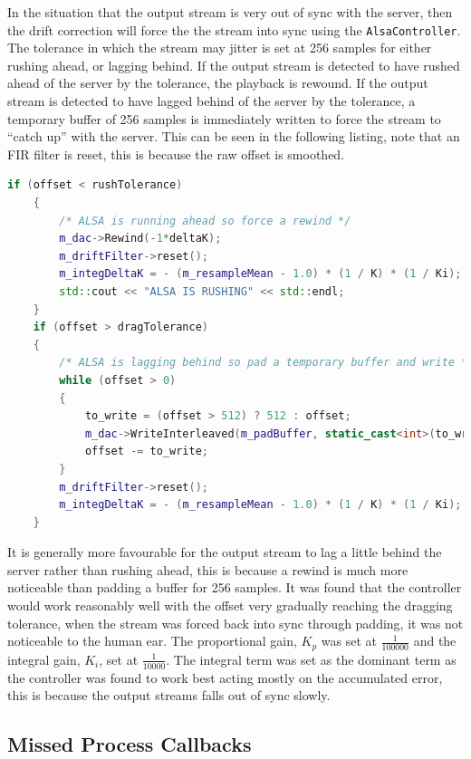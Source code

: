 \documentclass[main.tex]{subfiles}
\begin{document}
In the situation that the output stream is very out of sync with the server, then the drift correction will force the the stream into sync using the \lstinline{AlsaController}.
The tolerance in which the stream may jitter is set at 256 samples for either rushing ahead, or lagging behind.
If the output stream is detected to have rushed ahead of the server by the tolerance, the playback is rewound.
If the output stream is detected to have lagged behind of the server by the tolerance, a temporary buffer of 256 samples is immediately written to force the stream to ``catch up'' with the server. 
This can be seen in the following listing, note that an FIR filter is reset, this is because the raw offset is smoothed. 

\begin{lstlisting}[language=c++, caption={Hard Rewind or Buffer Padding for Unsynchronised Streams}]
    if (offset < rushTolerance)
    {
        /* ALSA is running ahead so force a rewind */
        m_dac->Rewind(-1*deltaK);
        m_driftFilter->reset();
        m_integDeltaK = - (m_resampleMean - 1.0) * (1 / K) * (1 / Ki);
        std::cout << "ALSA IS RUSHING" << std::endl;
    }
    if (offset > dragTolerance)
    {
        /* ALSA is lagging behind so pad a temporary buffer and write */
        while (offset > 0) 
        {
	        to_write = (offset > 512) ? 512 : offset;
            m_dac->WriteInterleaved(m_padBuffer, static_cast<int>(to_write));
	        offset -= to_write;  
	    }
        m_driftFilter->reset();
        m_integDeltaK = - (m_resampleMean - 1.0) * (1 / K) * (1 / Ki);  
    }
\end{lstlisting}
It is generally more favourable for the output stream to lag a little behind the server rather than rushing ahead, this is because a rewind is much more noticeable than padding a buffer for 256 samples.
It was found that the controller would work reasonably well with the offset very gradually reaching the dragging tolerance, when the stream was forced back into sync through padding, it was not noticeable to the human ear.
The proportional gain, $K_p$ was set at $\frac{1}{100000}$ and the integral gain, $K_i$, set at $\frac{1}{10000}$.
The integral term was set as the dominant term as the controller was found to work best acting mostly on the accumulated error, this is because the output streams falls out of sync slowly.

\subsection{Missed Process Callbacks}
\end{document}
